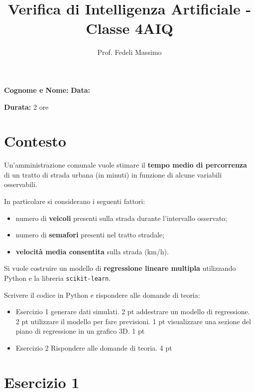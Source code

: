 \documentclass[a4paper,12pt]{article}
\title{Verifica di Intelligenza Artificiale - Classe 4AIQ }
\author{Prof. Fedeli Massimo}
\date{}
\begin{document}
	
	\maketitle
	
	\textbf{Cognome e Nome:} \underline{\hspace{8cm}} \hfill
	\textbf{Data:} \underline{\hspace{3cm}}
	
	\vspace{0.5cm}
	
	\textbf{Durata:} 2 ore
	
	\vspace{0.5cm}
	
	\section*{Contesto}
	
	Un'amministrazione comunale vuole stimare il \textbf{tempo medio di percorrenza} di un tratto di strada urbana (in minuti) in funzione di alcune variabili osservabili.
	
	In particolare si considerano i seguenti fattori:
	
	\begin{itemize}
		\item numero di \textbf{veicoli} presenti sulla strada durante l'intervallo osservato;
		\item numero di \textbf{semafori} presenti nel tratto stradale;
		\item \textbf{velocità media consentita} sulla strada (km/h).
	\end{itemize}
	
	Si vuole costruire un modello di \textbf{regressione lineare multipla} utilizzando Python e la libreria \texttt{scikit-learn}.
	
	Scrivere il codice in Python e rispondere alle domande di teoria:
	
	\begin{itemize}
		\item Esercizio 1
		\subitem generare dati simulati. 2 pt
		\subitem addestrare un modello di regressione. 2 pt
		\subitem utilizzare il modello per fare previsioni. 1 pt
		\subitem visualizzare una sezione del piano di regressione in un grafico 3D. 1  pt
		\item Esercizio 2
		\subitem Rispondere alle domande di teoria. 4 pt
	\end{itemize}
	
	\section*{Esercizio 1}
	
\end{document}
